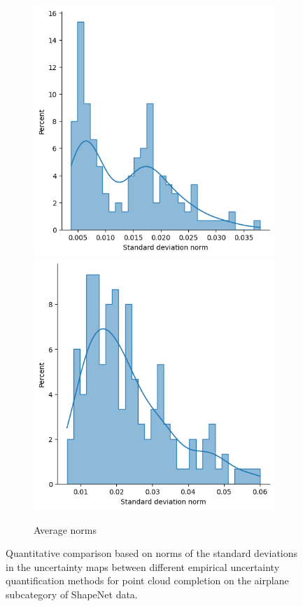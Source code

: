 \begin{figure}[htb]
\begin{subfigure}[t]{0.315\textwidth}
            \includegraphics[width=\textwidth]{figures/ensemble/matched_avg_std_norms.png}
            \includegraphics[width=\textwidth]{figures/imle/matched_avg_std_norms.png}
            \caption{Average norms}\label{fig:normstdairplane3}
          \end{subfigure}
          \caption{Quantitative comparison based on norms of the standard deviations in the uncertainty maps between different empirical uncertainty quantification methods for point cloud completion on the airplane subcategory of ShapeNet data.}
          \label{fig:normstdairplane}
        \end{figure}
        \newline

